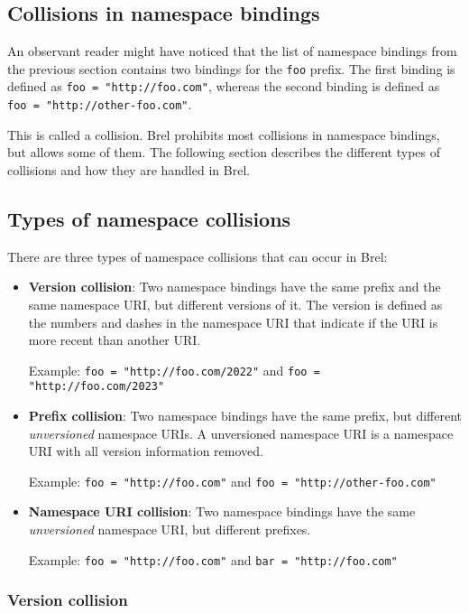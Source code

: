 \subsection{Collisions in namespace bindings}

An observant reader might have noticed that the list of namespace bindings from the previous section contains two bindings for the \texttt{foo} prefix.
The first binding is defined as \texttt{foo = "http://foo.com"}, whereas the second binding is defined as \texttt{foo = "http://other-foo.com"}.

This is called a collision. Brel prohibits most collisions in namespace bindings, but allows some of them.
The following section describes the different types of collisions and how they are handled in Brel.

\subsection{Types of namespace collisions}

There are three types of namespace collisions that can occur in Brel:

\begin{itemize}
    \item \textbf{Version collision}: Two namespace bindings have the same prefix and the same namespace URI, but different versions of it.
    The version is defined as the numbers and dashes in the namespace URI that indicate if the URI is more recent than another URI.
    
    Example: \texttt{foo = "http://foo.com/2022"} and \texttt{foo = "http://foo.com/2023"}
    \item \textbf{Prefix collision}: Two namespace bindings have the same prefix, but different \textit{unversioned} namespace URIs.
    A unversioned namespace URI is a namespace URI with all version information removed.
    
    Example: \texttt{foo = "http://foo.com"} and \texttt{foo = "http://other-foo.com"}
    \item \textbf{Namespace URI collision}: Two namespace bindings have the same \textit{unversioned} namespace URI, but different prefixes.
    
    Example: \texttt{foo = "http://foo.com"} and \texttt{bar = "http://foo.com"}
\end{itemize}

\subsubsection{Version collision}

